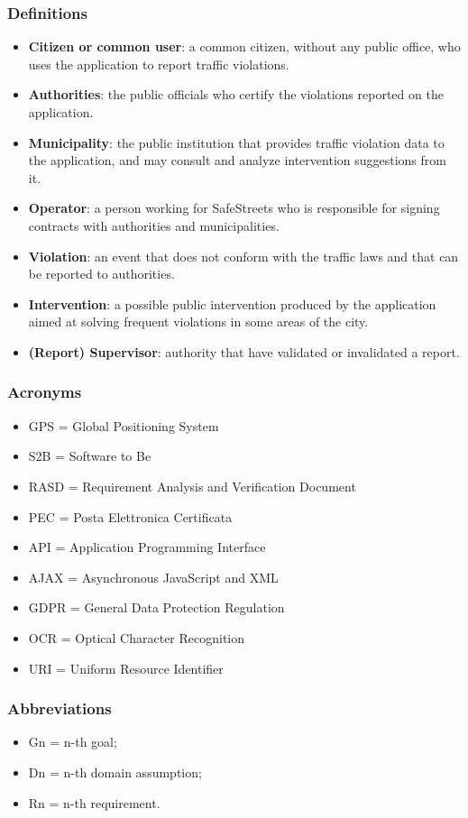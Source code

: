 \subsubsection{Definitions}
	\begin{itemize}
		\item \textbf{Citizen or common user}: a common citizen, without any public office, who uses the application to report traffic violations.
		\item \textbf{Authorities}: the public officials who certify the violations reported on the application.
		\item \textbf{Municipality}: the public institution that provides traffic violation data to the application, and may consult and analyze intervention suggestions from it.
		\item \textbf{Operator}: a person working for SafeStreets who is responsible for signing contracts with authorities and municipalities.
		\item \textbf{Violation}: an event that does not conform with the traffic laws and that can be reported to authorities.
		\item \textbf{Intervention}: a possible public intervention produced by the application aimed at solving frequent violations in some areas of the city.
		\item \textbf{(Report) Supervisor}: authority that have validated or invalidated a report.
	\end{itemize}
\subsubsection{Acronyms}
\begin{itemize}
	\item GPS = Global Positioning System
	\item S2B = Software to Be
	\item RASD = Requirement Analysis and Verification Document
	\item PEC = Posta Elettronica Certificata
	\item API = Application Programming Interface
	\item AJAX = Asynchronous JavaScript and XML
	\item GDPR = General Data Protection Regulation
	\item OCR = Optical Character Recognition
	\item URI = Uniform Resource Identifier
\end{itemize}
\subsubsection{Abbreviations}
\begin{itemize}
	\item Gn = n-th goal;
	\item Dn = n-th domain assumption;
	\item Rn = n-th requirement.
\end{itemize}